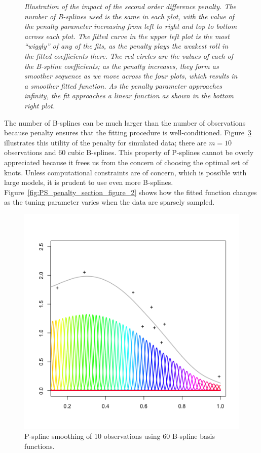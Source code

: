 \documentclass[12pt]{article}
\theoremstyle{definition}
\begin{document}
\begin{figure}[H]
\begin{subfigure}{.5\textwidth}
  \label{fig:pspline_small_lambda}
\end{subfigure}
\caption{\textit{Illustration of the impact of the second order difference penalty. The number of B-splines used is the same in each plot, with the value of the penalty parameter increasing from left to right and top to bottom across each plot. The fitted curve in the upper left plot is the most ``wiggly'' of any of the fits, as the penalty plays the weakest roll in the fitted coefficients there. The red circles are the values of each of the B-spline coefficients; as the penalty increases, they form as smoother sequence as we move across the four plots, which results in a smoother fitted function. As the penalty parameter approaches infinity, the fit approaches a linear function as shown in the bottom right plot.}}
\label{fig:second-ord-PS-pen-SML-lambda}
\end{figure}


The number of B-splines can be much larger than the number of observations because penalty ensures that the fitting procedure is well-conditioned. Figure~\ref{fig:overcomplete_basis_pspline} illustrates this utility of the penalty for simulated data; there are $m=10$ observations and $60$ cubic B-splines. This property of P-splines cannot be overly appreciated because it frees us from the concern of choosing the optimal set of knots. Unless computational constraints are of concern, which is possible with large models, it is prudent to use even more B-splines. Figure~\ref{fig:PS_penalty_section_figure_2} shows how the fitted function changes as the tuning parameter varies when the data are sparsely sampled. 

\begin{figure}[H]   \label{fig:overcomplete_basis_pspline}
  \centering
   \graphicspath{{img/}}
  \includegraphics[scale=0.75]{pspline_10obs_60_basis_functions.png}
  \caption{P-spline smoothing of 10 observations using 60 B-spline basis functions.}
\end{figure}
\end{document}
